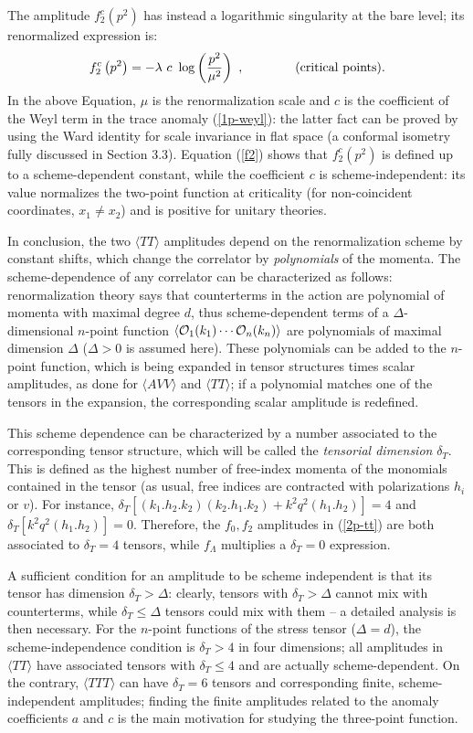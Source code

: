 \documentclass[11pt]{article}
\newcommand{\beq}{\begin{equation}}
\newcommand{\eeq}{\end{equation}}
\def\D{\Delta}
\def\l{\lambda}
\def\bra{\langle}
\def\ket{\rangle}
\def\dt{{\delta_T}} %
\begin{document}
The amplitude $f^c_2\left(p^2 \right)$ has instead a logarithmic 
singularity at the bare level; its renormalized expression is:
\beq\label{f2} 
f^c_2\left(p^2 \right) = -\l\ c\ \log\left( {p^2\over \mu^2} \right)\ ,
 \qquad\qquad ({\rm critical}\ {\rm points}). 
\eeq 
In the above Equation, $\mu$ is the renormalization scale and 
$c$ is the coefficient of the Weyl term in the trace anomaly 
(\ref{1p-weyl}): 
the latter fact can be proved \cite{duff}\cite{cfl}
by using the Ward identity for scale invariance
in flat space (a conformal isometry fully discussed in Section 3.3).
Equation (\ref{f2}) shows that $f^c_2\left(p^2 \right)$ is defined up to a  
scheme-dependent constant, while the coefficient $c$ is  
scheme-independent: its value normalizes the two-point function at
criticality (for non-coincident coordinates, $x_1\neq x_2$) 
and is positive for unitary theories.

In conclusion, the two $\bra TT\ket$ amplitudes depend on the renormalization
scheme by constant shifts, which change the correlator by
{\it polynomials} of the momenta.
The scheme-dependence of any correlator can be characterized as follows:
renormalization theory says that counterterms in the action
are polynomial of momenta with maximal degree 
$d$, thus scheme-dependent terms of a $\D$-dimensional $n$-point function  
$\bra {\cal O}_1(k_1)\cdots {\cal O}_n (k_n) \ket $ are polynomials of
maximal dimension $\D$ ($\D >0$ is assumed here). 
These polynomials can be added to the $n$-point function,
which is being expanded in tensor structures times scalar amplitudes,
as done for $\bra AVV\ket$ and $\bra TT\ket$;
if a polynomial matches one of the tensors in the expansion, 
the corresponding scalar amplitude is redefined.

This scheme dependence can be characterized
by a number associated to the corresponding
tensor structure, which will be called the {\it tensorial dimension} $\dt$.
This is defined as the highest number of free-index momenta of 
the monomials contained in the tensor
(as usual, free indices are contracted with polarizations $h_i$ or $v$).  
For instance, $\dt [ (k_1.h_2.k_2)(k_2.h_1.k_2) + k^2 q^2 (h_1.h_2)]= 4$
and $\dt [ k^2 q^2 (h_1.h_2)] = 0$. 
Therefore, the $f_0,f_2$ amplitudes in (\ref{2p-tt})
are both associated to $\dt =4$ tensors, while $f_\Lambda$ 
multiplies a $\dt =0$ expression. 

A sufficient condition for an amplitude to be scheme independent
is that its tensor has dimension $\dt > \D$:
clearly, tensors with $\dt>\D$ cannot mix with counterterms,
while $\dt \le \D$ tensors could mix with them -- a detailed analysis is 
then necessary.
For the $n$-point functions of the stress tensor ($\D=d$), 
the scheme-independence condition is $\dt > 4$ in four dimensions; all
amplitudes in $\bra TT\ket$  have associated tensors with $\dt\le 4$ and 
are actually scheme-dependent.
On the contrary, $\bra TTT\ket$ can have $\dt =6$ tensors and corresponding
finite, scheme-independent amplitudes;
finding the finite amplitudes related to the anomaly coefficients $a$ and $c$
is the main motivation for studying the three-point function.
\end{document}
